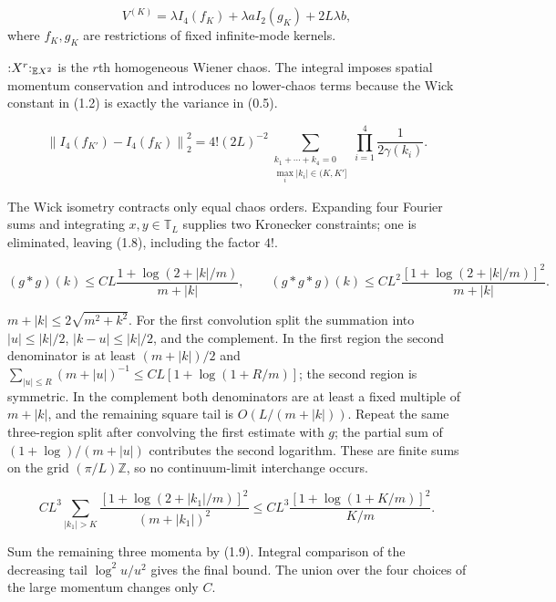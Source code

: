 \documentclass[11pt,a4paper]{article}
\newcommand{\T}{\mathbb T}
\newcommand{\Z}{\mathbb Z}
\begin{document}
\QedStep


\[
 V^{(K)}=\lambda I_4(f_K)+\lambda a I_2(g_K)+2L\lambda b,
\tag{1.7}
\]
where $f_K,g_K$ are restrictions of fixed infinite-mode kernels.

\Because ${:}X^r{:}_{\mathbb E X^2}$ is the $r$th homogeneous Wiener chaos.
The integral imposes spatial momentum conservation and introduces no lower-chaos
terms because the Wick constant in (1.2) is exactly the variance in (0.5).

\[
 \left\|I_4(f_{K'})-I_4(f_K)\right\|_2^2
 =4!(2L)^{-2}
 \sum_{\substack{k_1+\cdots+k_4=0\\
       \max_i|k_i|\in(K,K']}}
 \prod_{i=1}^4\frac1{2\gamma(k_i)}.
\tag{1.8}
\]

\Because The Wick isometry contracts only equal chaos orders.  Expanding four
Fourier sums and integrating $x,y\in\T_L$ supplies two Kronecker constraints;
one is eliminated, leaving (1.8), including the factor $4!$.

\[
 (g*g)(k)\le CL\frac{1+\log(2+|k|/m)}{m+|k|},\qquad
 (g*g*g)(k)\le CL^2\frac{[1+\log(2+|k|/m)]^2}{m+|k|}.
\tag{1.9}
\]

\Because $m+|k|\le2\sqrt{m^2+k^2}$.  For the first convolution split the
summation into $|u|\le|k|/2$, $|k-u|\le|k|/2$, and the complement.  In the
first region the second denominator is at least $(m+|k|)/2$ and
$\sum_{|u|\le R}(m+|u|)^{-1}\le CL[1+\log(1+R/m)]$; the second region is
symmetric.  In the complement both denominators are at least a fixed multiple of
$m+|k|$, and the remaining square tail is $O(L/(m+|k|))$.  Repeat the same
three-region split after convolving the first estimate with $g$; the partial sum of
$(1+\log)/(m+|u|)$ contributes the second logarithm.  These are finite sums on the
grid $(\pi/L)\Z$, so no continuum-limit interchange occurs.

\[
 CL^3\sum_{|k_1|>K}
 \frac{[1+\log(2+|k_1|/m)]^2}{(m+|k_1|)^2}
 \le CL^3\frac{[1+\log(1+K/m)]^2}{K/m}.
\tag{1.10}
\]

\Because Sum the remaining three momenta by (1.9).  Integral comparison of the
decreasing tail $\log^2 u/u^2$ gives the final bound.  The union over the four
choices of the large momentum changes only $C$.
\end{document}
